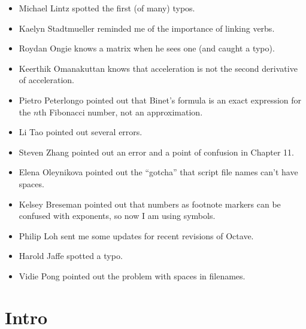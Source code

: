\documentclass{book}
\begin{document}
\begin{itemize}

\item Michael Lintz spotted the first (of many) typos.

\item Kaelyn Stadtmueller reminded me of the importance of linking
verbs.

\item Roydan Ongie knows a matrix when he sees one (and caught a typo).

\item Keerthik Omanakuttan knows that acceleration is not the
second derivative of acceleration.

\item Pietro Peterlongo pointed out that Binet's formula is an
exact expression for the $n$th Fibonacci number, not an approximation.

\item Li Tao pointed out several errors.

\item Steven Zhang pointed out an error and a point of confusion
in Chapter 11.

\item Elena Oleynikova pointed out the ``gotcha'' that script file names
can't have spaces.

\item Kelsey Breseman pointed out that numbers as footnote markers
can be confused with exponents, so now I am using symbols.

\item Philip Loh sent me some updates for recent revisions of Octave.

\item Harold Jaffe spotted a typo.

\item Vidie Pong pointed out the problem with spaces in filenames.

\end{itemize}


\tableofcontents

\mainmatter



\chapter*{Intro}
\end{document}
